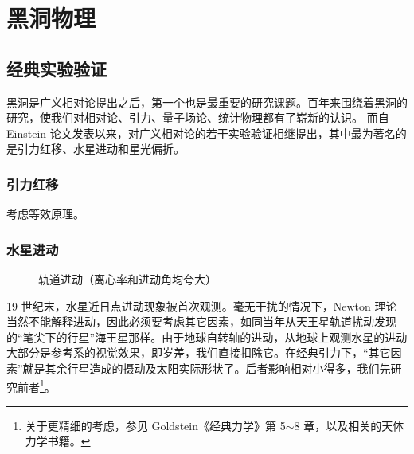 \chapter{黑洞物理}\label{chpt:BH}

\section{经典实验验证}

黑洞是广义相对论提出之后，第一个也是最重要的研究课题。百年来围绕着黑洞的研究，使我们对相对论、引力、量子场论、统计物理都有了崭新的认识。
而自 Einstein 论文发表以来，对广义相对论的若干实验验证相继提出，其中最为著名的是引力红移、水星进动和星光偏折。

\subsection{引力红移}

考虑等效原理。

\subsection{水星进动}

\begin{figure}\centering
    \caption{\small 轨道进动（离心率和进动角均夸大）}
\end{figure}

19 世纪末，水星近日点进动现象被首次观测。毫无干扰的情况下，Newton 理论当然不能解释进动，因此必须要考虑其它因素，如同当年从天王星轨道扰动发现的“笔尖下的行星”海王星那样。由于地球自转轴的进动，从地球上观测水星的进动大部分是参考系的视觉效果，即岁差，我们直接扣除它。在经典引力下，“其它因素”就是其余行星造成的摄动及太阳实际形状了。后者影响相对小得多，我们先研究前者\footnote{关于更精细的考虑，参见 Goldstein《经典力学》第 5$\sim$8 章，以及相关的天体力学书籍。}。

